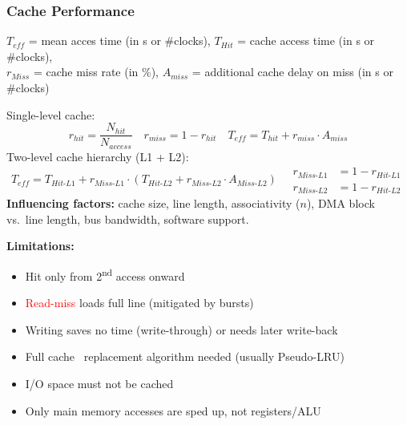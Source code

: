 
  \subsubsection{Cache Performance}
  $T_{eff}$ = mean acces time (in s or \#clocks), $T_{Hit}$ = cache access time (in s or \#clocks),\\
  $r_{Miss}$ = cache miss rate (in \%), $A_{miss}$ = additional cache delay on miss (in s or \#clocks)
  
  Single-level cache:
  \vspace*{-0.3cm}
    \[\boxed{r_{hit}=\frac{N_{hit}}{N_{access}}} \quad \boxed{r_{miss}= 1 - r_{hit}} \quad \boxed{T_{eff}=T_{hit}+r_{miss}\cdot A_{miss}}\]
    \vspace*{-0.2cm}
    Two-level cache hierarchy (L1 + L2):
    \vspace{-0.4cm}
    \[
      \boxed{T_{eff} = T_{Hit\text{-}L1} + r_{Miss\text{-}L1} \cdot \left( T_{Hit\text{-}L2} + r_{Miss\text{-}L2} \cdot A_{Miss\text{-}L2} \right)}
      \quad
      \boxed{\begin{aligned}
        r_{Miss\text{-}L1} &= 1 - r_{Hit\text{-}L1} \\
        r_{Miss\text{-}L2} &= 1 - r_{Hit\text{-}L2}
      \end{aligned}}
    \]
      \vspace*{-0.1cm}
    \textbf{Influencing factors:} cache size, line length, associativity ($n$), DMA block vs.\ line length, bus bandwidth, software support.

    \textbf{Limitations:}
    \begin{itemize}
      \item \textcolor{codeGreen}{Hit} only from 2\textsuperscript{nd} access onward
      \item \textcolor{red}{Read-miss} loads full line (mitigated by bursts)
      \item Writing saves no time (write-through) or needs later write-back
      \item Full cache \textrightarrow\ replacement algorithm needed (usually Pseudo-LRU)
      \item I/O space must not be cached
      \item Only main memory accesses are sped up, not registers/ALU
    \end{itemize}

